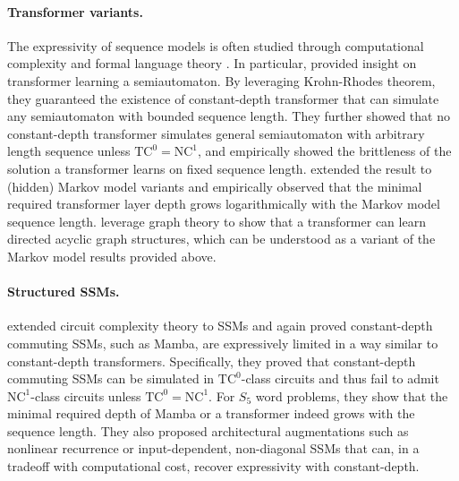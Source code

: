 \documentclass{article}
\theoremstyle{plain}
\theoremstyle{definition}
\theoremstyle{remark}
\begin{document}
\paragraph{Transformer variants.}
The expressivity of sequence models is often studied through computational complexity and formal language theory \citep{GilesSCLC89,gers2001lstm,schmidhuber2001evaluating,weissGY18,hahn2020theoretical,MerrillWGSSY20,BhattamishraAG20,deletang2022neural,irie2023practical,StroblMW0A24,beck2024xlstm}.
In particular, \citet{liu2022transformers} provided insight on transformer learning a semiautomaton.
By leveraging Krohn-Rhodes theorem, they guaranteed the existence of constant-depth transformer that can simulate any semiautomaton with bounded sequence length.
They further showed that no constant-depth transformer simulates general semiautomaton with arbitrary length sequence unless $\text{TC}^0 = \text{NC}^1$, and empirically showed the brittleness of the solution a transformer learns on fixed sequence length.
\citet{hu2024limitation} extended the result to (hidden) Markov model variants and empirically observed that the minimal required transformer layer depth grows logarithmically with the Markov model sequence length.
\citet{cheng2025transformers} leverage graph theory to show that a transformer can learn directed acyclic graph structures,
which can be understood as a variant of the Markov model results provided above.

\paragraph{Structured SSMs.}
\citet{merrill2024illusion} extended circuit complexity theory to SSMs and again proved constant-depth commuting SSMs, such as Mamba, are expressively limited in a way similar to constant-depth transformers. Specifically, they proved that constant-depth commuting SSMs can be simulated in $\text{TC}^0$-class circuits and thus fail to admit $\text{NC}^1$-class circuits unless $\text{TC}^0 = \text{NC}^1$.
For $S_5$ word problems, they show that the minimal required depth of Mamba or a transformer indeed grows with the sequence length.
They also proposed architectural augmentations such as nonlinear recurrence or input-dependent, non-diagonal SSMs that can, in a tradeoff with computational cost, recover expressivity with constant-depth.
\end{document}
